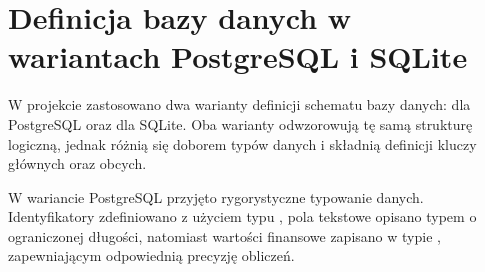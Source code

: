 \documentclass[a4paper,11pt,english,openany,oneside]{sphinxmanual}
\begin{document}
\section{Definicja bazy danych w wariantach PostgreSQL i SQLite}
\label{\detokenize{rozdzial_4/index:definicja-bazy-danych-w-wariantach-postgresql-i-sqlite}}
\sphinxAtStartPar
W projekcie zastosowano dwa warianty definicji schematu bazy danych: dla PostgreSQL oraz dla SQLite. Oba warianty odwzorowują tę samą strukturę logiczną, jednak różnią się doborem typów danych i składnią definicji kluczy głównych oraz obcych.

\sphinxAtStartPar
W wariancie PostgreSQL przyjęto rygorystyczne typowanie danych. Identyfikatory zdefiniowano z użyciem typu , pola tekstowe opisano typem  o ograniczonej długości, natomiast wartości finansowe zapisano w typie , zapewniającym odpowiednią precyzję obliczeń.
\end{document}
